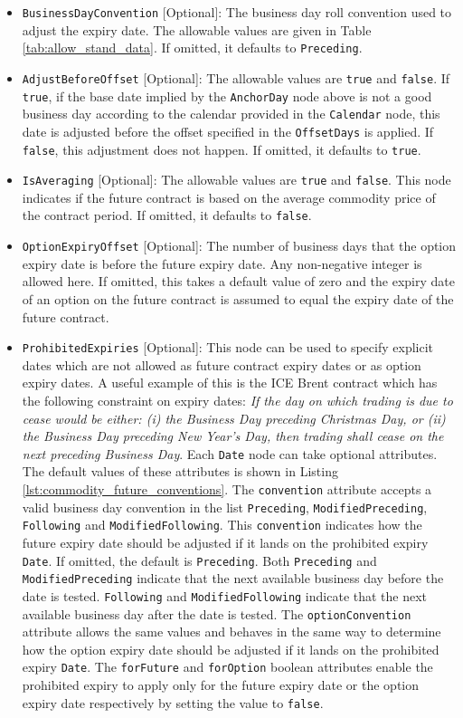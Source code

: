 \begin{itemize}
\item \lstinline!BusinessDayConvention! [Optional]: The business day roll convention used to adjust the expiry date. The allowable values are given in Table \ref{tab:allow_stand_data}. If omitted, it defaults to \lstinline!Preceding!.
\item \lstinline!AdjustBeforeOffset! [Optional]: The allowable values are \lstinline!true! and \lstinline!false!. If \lstinline!true!, if the base date implied by the \lstinline!AnchorDay! node above is not a good business day according to the calendar provided in the \lstinline!Calendar! node, this date is adjusted before the offset specified in the \lstinline!OffsetDays! is applied. If \lstinline!false!, this adjustment does not happen. If omitted, it defaults to \lstinline!true!. 
\item \lstinline!IsAveraging! [Optional]: The allowable values are \lstinline!true! and \lstinline!false!. This node indicates if the future contract is based on the average commodity price of the contract period. If omitted, it defaults to \lstinline!false!.
\item \lstinline!OptionExpiryOffset! [Optional]: The number of business days that the option expiry date is before the future expiry date. Any non-negative integer is allowed here. If omitted, this takes a default value of zero and the expiry date of an option on the future contract is assumed to equal the expiry date of the future contract.
\item \lstinline!ProhibitedExpiries! [Optional]: This node can be used to specify explicit dates which are not allowed as future contract expiry dates or as option expiry dates. A useful example of this is the ICE Brent contract which has the following constraint on expiry dates: \emph{If the day on which trading is due to cease would be either: (i) the Business Day preceding Christmas Day, or (ii) the Business Day preceding New Year’s Day, then trading shall cease on the next preceding Business Day}. Each \lstinline!Date! node can take optional attributes. The default values of these attributes is shown in Listing \ref{lst:commodity_future_conventions}. The \lstinline!convention! attribute accepts a valid business day convention in the list \lstinline!Preceding!, \lstinline!ModifiedPreceding!, \lstinline!Following! and \lstinline!ModifiedFollowing!. This \lstinline!convention! indicates how the future expiry date should be adjusted if it lands on the prohibited expiry \lstinline!Date!. If omitted, the default is \lstinline!Preceding!. Both \lstinline!Preceding! and \lstinline!ModifiedPreceding! indicate that the next available business day before the date is tested. \lstinline!Following! and \lstinline!ModifiedFollowing! indicate that the next available business day after the date is tested. The \lstinline!optionConvention! attribute allows the same values and behaves in the same way to determine how the option expiry date should be adjusted if it lands on the prohibited expiry \lstinline!Date!. The \lstinline!forFuture! and \lstinline!forOption! boolean attributes enable the prohibited expiry to apply only for the future expiry date or the option expiry date respectively by setting the value to \lstinline!false!.

\end{itemize}
